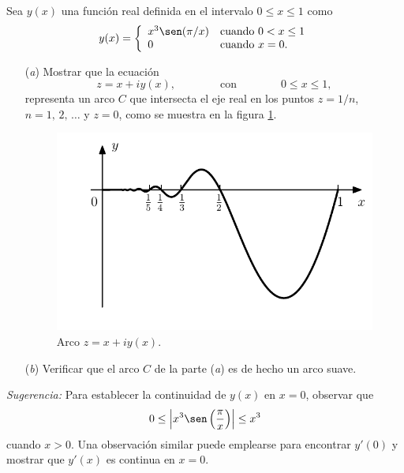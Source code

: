 \documentclass[a4paper]{report}
\begin{document}
Sea \(y(x)\) una función real definida en el intervalo \(0\leq x\leq1\) como
\[
 y(x)=\left\{ 
 \begin{array}{ll}
  x^3\sen(\pi/x)&\textrm{cuando }0<x\leq1\\
  0&\textrm{cuando }x=0.
 \end{array}
 \right.
\]
\begin{enumerate}
 \item[(\textit{a})] Mostrar que la ecuación
 \[
  z=x+iy(x),
  \qquad\qquad\textrm{con}\qquad\qquad
  0\leq x\leq1,
 \]
 representa un arco \(C\) que intersecta el eje real en los puntos \(z=1/n\), \(n=1,\,2,\,\dots\) y \(z=0\), como se muestra en la figura \ref{fig:exercise_43_06}.
 \begin{figure}[!htb]
  \begin{minipage}[c]{0.56\textwidth}
    \includegraphics[width=\textwidth]{figuras/exercise_43_06.pdf}
  \end{minipage}\hfill
  \begin{minipage}[c]{0.34\textwidth}
    \caption{
       Arco \(z=x+iy(x)\).
    }\label{fig:exercise_43_06}
  \end{minipage}
\end{figure}
 \item[(\textit{b})] Verificar que el arco \(C\) de la parte (\textit{a}) es de hecho un arco suave.
 \end{enumerate}
 
\emph{Sugerencia:} Para establecer la continuidad de \(y(x)\) en \(x=0\), observar que 
\[
 0\leq\left|x^3\sen\left(\frac{\pi}{x}\right)\right|\leq x^3
\]
cuando \(x>0\). Una observación similar puede emplearse para encontrar \(y'(0)\) y mostrar que \(y'(x)\) es continua en \(x=0\).
\end{document}
